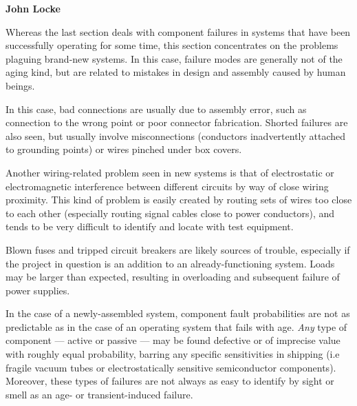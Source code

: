 \stopsubsection

\stopsection

\startsection[title={Likely Failures in Unproven
Systems},reference={sec:xtocid157909719}]

\startblockquote
{\em {}}

{\bf John Locke}
\stopblockquote

Whereas the last section deals with component failures in systems that
have been successfully operating for some time, this section
concentrates on the problems plaguing brand-new systems. In this case,
failure modes are generally not of the aging kind, but are related to
mistakes in design and assembly caused by human beings.

\startsubsection[title={Wiring
Problems},reference={sec:xtocid157909720}]

In this case, bad connections are usually due to assembly error, such as
connection to the wrong point or poor connector fabrication. Shorted
failures are also seen, but usually involve misconnections (conductors
inadvertently attached to grounding points) or wires pinched under box
covers.

Another wiring-related problem seen in new systems is that of
electrostatic or electromagnetic interference between different circuits
by way of close wiring proximity. This kind of problem is easily created
by routing sets of wires too close to each other (especially routing
signal cables close to power conductors), and tends to be very difficult
to identify and locate with test equipment.

\stopsubsection

\startsubsection[title={Power Supply
Problems},reference={sec:xtocid157909721}]

Blown fuses and tripped circuit breakers are likely sources of trouble,
especially if the project in question is an addition to an
already-functioning system. Loads may be larger than expected, resulting
in overloading and subsequent failure of power supplies.

\stopsubsection

\startsubsection[title={Defective
Components},reference={sec:xtocid157909722}]

In the case of a newly-assembled system, component fault probabilities
are not as predictable as in the case of an operating system that fails
with age. {\em Any} type of component --- active or passive --- may be
found defective or of imprecise value  with
roughly equal probability, barring any specific sensitivities in
shipping (i.e fragile vacuum tubes or electrostatically sensitive
semiconductor components). Moreover, these types of failures are not
always as easy to identify by sight or smell as an age- or
transient-induced failure.

